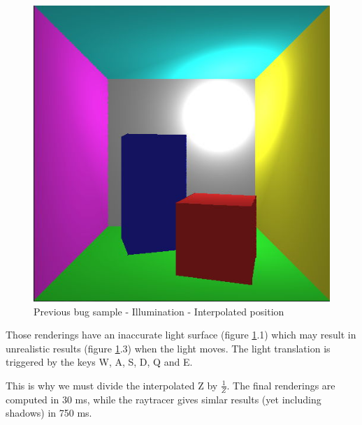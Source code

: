 \begin{figure}[H]
\endminipage
{}
    \centering
    \includegraphics[width=\linewidth]{img/interpolated_pos3.jpg}
\endminipage
\caption{Previous bug sample - Illumination - Interpolated position}
\label{interpolated_pos}
\end{figure}

Those renderings have an inaccurate light surface (figure \ref{interpolated_pos}.1) which may result in unrealistic results (figure \ref{interpolated_pos}.3) when the light moves. The light translation is triggered by the keys W, A, S, D, Q and E.

This is why we must divide the interpolated Z by $\frac{1}{Z}$. The final renderings are computed in 30 ms, while the raytracer gives simlar results (yet including shadows) in 750 ms.

